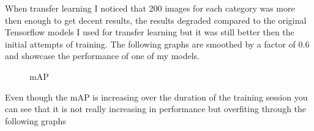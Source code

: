 \newpage \noindent
When transfer learning I noticed that 200 images for each category was more then enough to get decent results, the results degraded compared
to the original Tensorflow models I used for transfer learning but it was still better then the initial attempts of training. The following
graphs are smoothed by a factor of 0.6 and showcase the performance of one of my models.
\begin{figure}[hbt!]
    \begin{center}
        \caption{mAP}
    \end{center}
\end{figure}
\newpage \noindent
Even though the mAP is increasing over the duration of the training session you can see that it is not really increasing in performance but
overfiting through the following graphs
